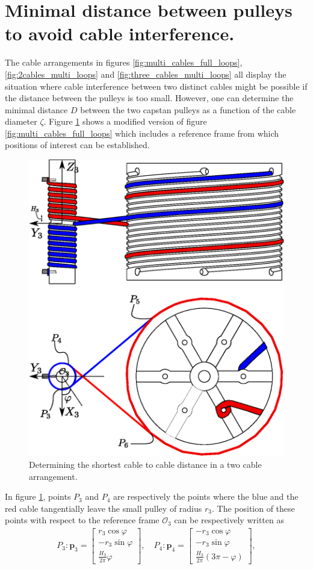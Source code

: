 \documentclass[10pt,cleanfoot]{asme2ej}
\begin{document}
\section{Minimal distance between pulleys to avoid cable interference.}
The cable arrangements in figures \ref{fig:multi_cables_full_loops}, \ref{fig:2cables_multi_loops} and \ref{fig:three_cables_multi_loops} all display the situation where cable interference between two distinct cables might be possible if the distance between the pulleys is too small. However, one can determine the minimal distance $D$ between the two capstan pulleys as a function of the cable diameter $\zeta$. Figure \ref{fig:cable_interference} shows a modified version of figure \ref{fig:multi_cables_full_loops} which includes a reference frame from which positions of interest can be established. 
\begin{figure}
\centering
\includegraphics[width =0.5\columnwidth]{fig_cable_interference.eps}
\caption{Determining the shortest cable to cable distance in a two cable arrangement.}
\label{fig:cable_interference}
\end{figure}
 In figure \ref{fig:cable_interference}, points $P_3$ and $P_4$ are respectively the points where the blue and the red cable tangentially leave the small pulley of radius $r_3$.
The position of these points with respect to the reference frame $\mathcal{O}_3$ can be respectively written as 
\begin{align}
P_3: \mathbf{p}_3 = \begin{bmatrix}
r_3\cos\varphi\\
-r_3\sin\varphi\\
\frac{H_3}{2\pi}\varphi
\end{bmatrix},\quad P_4:\mathbf{p}_4 = \begin{bmatrix}
-r_3\cos\varphi\\
-r_3\sin\varphi\\
\frac{H_3}{2\pi}\left(3\pi-\varphi\right)
\end{bmatrix},
\end{align}
\end{document}

